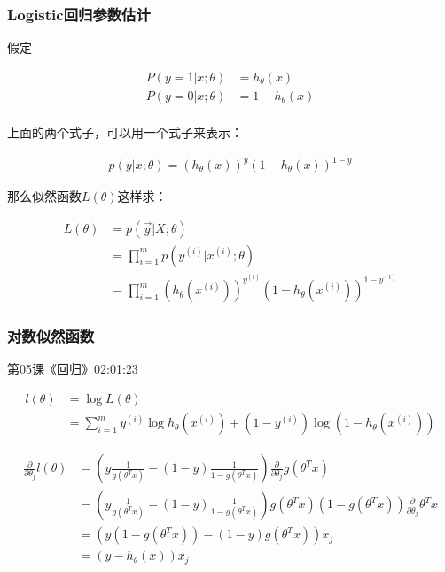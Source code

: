 \documentclass[UTF8]{ctexbook}
\begin{document}
\subsubsection{Logistic回归参数估计}

假定

 \begin{equation}
\begin{aligned}
P(y=1|x;\theta)&=h_{\theta}(x)\\
P(y=0|x;\theta)&=1-h_{\theta}(x)\\
\end{aligned}
\end{equation}

上面的两个式子，可以用一个式子来表示：

 \begin{equation}
\begin{aligned}
p(y|x;\theta)=(h_{\theta}(x))^{y}(1-h_{\theta}(x))^{1-y}
\end{aligned}
\end{equation}

那么似然函数$L(\theta)$这样求：

\begin{equation}
\begin{aligned}
L(\theta)&=p(\vec{y}|X;\theta)\\
&=\prod_{i=1}^{m}p(y^{(i)}|x^{(i)};\theta)\\
&=\prod_{i=1}^{m}(h_{\theta}(x^{(i)}))^{y^{(i)}}(1-h_{\theta}(x^{(i)}))^{1-y^{(i)}}
\end{aligned}
\end{equation}

\subsubsection{对数似然函数}

第05课《回归》02:01:23

\begin{equation}
\begin{aligned}
l(\theta) &= \log L(\theta) \\
&= \sum_{i=1}^{m} y^{(i)}\log h_{\theta}(x^{(i)}) + (1-y^{(i)}) \log (1-h_{\theta}(x^{(i)}))
\end{aligned}
\end{equation}

\begin{equation}
\begin{aligned}
\frac{\partial}{\partial \theta_{j}} l(\theta) &= (y \frac{1}{g(\theta^{T} x)} - (1-y) \frac{1}{1-g(\theta^{T} x)}) \frac{\partial}{\partial \theta_{j}} g(\theta^{T} x)\\
&=  (y \frac{1}{g(\theta^{T} x)} - (1-y) \frac{1}{1-g(\theta^{T} x)}) g(\theta^{T} x)(1-g(\theta^{T} x))\frac{\partial}{\partial \theta_{j}} \theta^{T}x \\
&= (y(1-g(\theta^{T} x))-(1-y)g(\theta^{T} x))x_{j}\\
&= (y-h_{\theta}(x))x_{j}
\end{aligned}
\end{equation}
\end{document}
